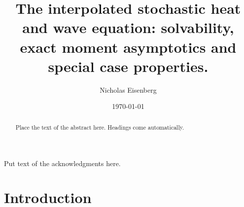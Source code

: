 \documentclass[12pt]{report}
\title{The interpolated stochastic heat and wave equation: solvability, exact moment asymptotics and special case properties.}
\author{Nicholas Eisenberg}
\date{\today} %
\theoremstyle{plain}
\theoremstyle{definition}
\numberwithin{equation}{section}
\begin{document}
\begin{romanpages}      %

\TitlePage 

\begin{abstract} 
Place the text of the abstract here. Headings come automatically.
\end{abstract}

\begin{acknowledgments}
Put text of the acknowledgments here.
\end{acknowledgments}

\begin{singlespace}

\begin{center} 
\renewcommand{\cftchapfont}{}
\renewcommand{\cftchappagefont}{}
\renewcommand{\cfttoctitlefont}{\normalsize}%
\renewcommand{\cftsecfont }{\normalsize}%
\renewcommand{\cftsecpagefont}{\normalsize}%
\tableofcontents 
\newpage
\renewcommand{\cftchapfont}{}
\renewcommand{\cftchappagefont}{}
\renewcommand{\cftloftitlefont}{\normalsize}%
\renewcommand{\cftsecfont}{\normalsize}%
\renewcommand{\cftsecpagefont}{\normalsize}%
\listoffigures
\newpage
\renewcommand{\cftchapfont}{}
\renewcommand{\cftchappagefont}{}
\renewcommand{\cftlottitlefont}{\normalsize}%
\renewcommand{\cftsecfont}{\normalsize}%
\renewcommand{\cftsecpagefont}{\normalsize}%
\listoftables
\end{center}
\end{singlespace}

\printnomenclature[0.5in] %
\end{romanpages}        %


\normalem       %

 \chapter {Introduction}  %
\vspace{-1cm} %
 
\end{document}
